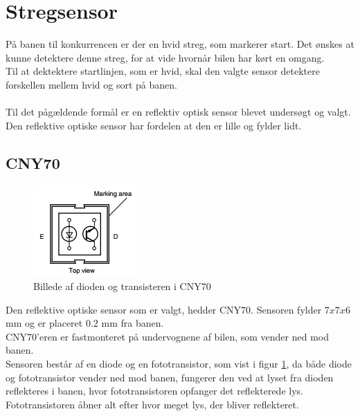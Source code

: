 \section{Stregsensor}
På banen til konkurrencen er der en hvid streg, som markerer start. Det ønskes at kunne detektere denne streg, for at vide hvornår bilen har kørt en omgang.\\
Til at dektektere startlinjen, som er hvid, skal den valgte sensor detektere forskellen mellem hvid og sort på banen.\\
 \\
Til det pågældende formål er en reflektiv optisk sensor blevet undersøgt og valgt. Den reflektive optiske sensor har fordelen at den er lille og fylder lidt.\\

\subsection{CNY70}
\begin{figure}
\includegraphics[scale=0.7]{./Graphics/CNY70-Diode}
\caption{Billede af dioden og transisteren i CNY70}
\label{CNY70}
\end{figure}
Den reflektive optiske sensor som er valgt, hedder CNY70. Sensoren fylder $7x7x6$ mm og er placeret $0.2$ mm fra banen. \\
CNY70'eren er fastmonteret på undervognene af bilen, som vender ned mod banen.\\

Sensoren består af en diode og en fototransistor, som vist i figur \ref{CNY70}, da både diode og fototransistor vender ned mod banen, fungerer den ved at lyset fra dioden reflekteres i banen, hvor fototransistoren opfanger det reflekterede lys. Fototransistoren åbner alt efter hvor meget lys, der bliver reflekteret. \\

